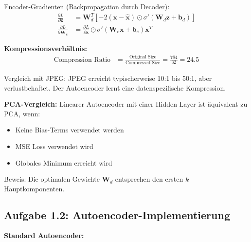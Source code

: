 ﻿\documentclass[12pt,a4paper]{article}
\begin{document}
Encoder-Gradienten (Backpropagation durch Decoder):
\begin{align}
\frac{\partial L}{\partial \mathbf{z}} &= \mathbf{W}_d^T \left[-2(\mathbf{x} - \hat{\mathbf{x}}) \odot \sigma'(\mathbf{W}_d \mathbf{z} + \mathbf{b}_d)\right] \\
\frac{\partial L}{\partial \mathbf{W}_e} &= \frac{\partial L}{\partial \mathbf{z}} \odot \sigma'(\mathbf{W}_e \mathbf{x} + \mathbf{b}_e) \mathbf{x}^T
\end{align}

\textbf{Kompressionsverhältnis:}
\begin{align}
\text{Compression Ratio} &= \frac{\text{Original Size}}{\text{Compressed Size}} = \frac{784}{32} = 24.5
\end{align}

Vergleich mit JPEG: JPEG erreicht typischerweise 10:1 bis 50:1, aber verlustbehaftet. Der Autoencoder lernt eine datenspezifische Kompression.

\textbf{PCA-Vergleich:}
Linearer Autoencoder mit einer Hidden Layer ist äquivalent zu PCA, wenn:
\begin{itemize}
    \item Keine Bias-Terms verwendet werden
    \item MSE Loss verwendet wird
    \item Globales Minimum erreicht wird
\end{itemize}

Beweis: Die optimalen Gewichte $\mathbf{W}_d$ entsprechen den ersten $k$ Hauptkomponenten.

\subsection{Aufgabe 1.2: Autoencoder-Implementierung}

\textbf{Standard Autoencoder:}
\end{document}
